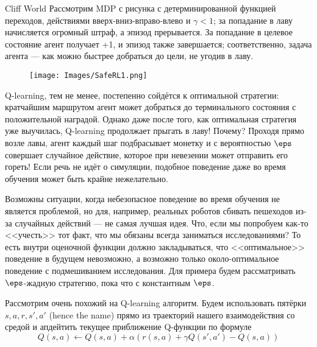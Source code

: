 \begin{exampleBox}[label=ex:cliffworld]{Cliff World}
Рассмотрим MDP с рисунка с детерминированной функцией переходов, действиями вверх-вниз-вправо-влево и $\gamma < 1$; за попадание в лаву начисляется огромный штраф, а эпизод прерывается. За попадание в целевое состояние агент получает +1, и эпизод также завершается; соответственно, задача агента --- как можно быстрее добраться до цели, не угодив в лаву.

\begin{wrapfigure}{r}{0.35\textwidth}
\centering
\texttt{[image: Images/SafeRL1.png]}
\end{wrapfigure}
Q-learning, тем не менее, постепенно сойдётся к оптимальной стратегии: кратчайшим маршрутом агент может добраться до терминального состояния с положительной наградой. Однако даже после того, как оптимальная стратегия уже выучилась, Q-learning продолжает прыгать в лаву! Почему? Проходя прямо возле лавы, агент каждый шаг подбрасывает монетку и с вероятностью $\eps$ совершает случайное действие, которое при невезении может отправить его гореть! Если речь не идёт о симуляции, подобное поведение даже во время обучения может быть крайне нежелательно.
\end{exampleBox}

Возможны ситуации, когда небезопасное поведение во время обучения не является проблемой, но для, например, реальных роботов сбивать пешеходов из-за случайных действий --- не самая лучшая идея. Что, если мы попробуем как-то <<учесть>> тот факт, что мы обязаны всегда заниматься исследованиями? То есть внутри оценочной функции должно закладываться, что <<оптимальное>> поведение в будущем невозможно, а возможно только около-оптимальное поведение с подмешиванием исследования. Для примера будем рассматривать $\eps$-жадную стратегию, пока что с константным $\eps$.

Рассмотрим очень похожий на Q-learning алгоритм. Будем использовать пятёрки $s, a, r, s', a'$ (hence the name) прямо из траекторий нашего взаимодействия со средой и апдейтить текущее приближение Q-функции по формуле
\begin{equation}\label{sarsa}
Q(s, a) \leftarrow Q(s, a) + \alpha \left( r(s, a) + \gamma Q(s', a') - Q(s, a) \right)
\end{equation}

